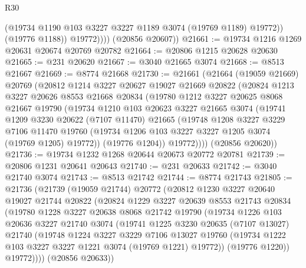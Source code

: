 \begin{lexlean}{R30}
\begin{coremodule}
                  (@19734 @1190 @103 @3227 @3227 @1189 @3074 (@19769 @1189) @19772))
                (@19776 @1188))
              @19772))))
      (@20856 @20607))
@21661 := @19734 @1216 @1269 @20631 @20674 @20769 @20782
@21664 := @20806 @1215 @20628 @20630
@21665 := @231 @20620
@21667 := @3040 @21665 @3074
@21668 := @8513 @21667
@21669 := @8774 @21668
@21730 := @21661
    (@21664
      (@19059 @21669)
      @20769
      (@20812
        @1214
        @3227
        @20627
        @19027
        @21669
        @20822
        (@20824
          @1213
          @3227
          @20626
          @8553
          @21668
          @20834
          (@19780
            @1212
            @3227
            @20625
            @8068
            @21667
            @19790
            (@19734
              @1210
              @103
              @20623
              @3227
              @21665
              @3074
              (@19741
                @1209
                @3230
                @20622
                (@7107 @11470)
                @21665
                (@19748
                  @1208
                  @3227
                  @3229
                  @7106
                  @11470
                  @19760
                  (@19734 @1206 @103 @3227 @3227 @1205 @3074 (@19769 @1205) @19772))
                (@19776 @1204))
              @19772))))
      (@20856 @20620))
@21736 := @19734 @1232 @1268 @20644 @20673 @20772 @20781
@21739 := @20806 @1231 @20641 @20643
@21740 := @231 @20633
@21742 := @3040 @21740 @3074
@21743 := @8513 @21742
@21744 := @8774 @21743
@21805 := @21736
    (@21739
      (@19059 @21744)
      @20772
      (@20812
        @1230
        @3227
        @20640
        @19027
        @21744
        @20822
        (@20824
          @1229
          @3227
          @20639
          @8553
          @21743
          @20834
          (@19780
            @1228
            @3227
            @20638
            @8068
            @21742
            @19790
            (@19734
              @1226
              @103
              @20636
              @3227
              @21740
              @3074
              (@19741
                @1225
                @3230
                @20635
                (@7107 @13027)
                @21740
                (@19748
                  @1224
                  @3227
                  @3229
                  @7106
                  @13027
                  @19760
                  (@19734 @1222 @103 @3227 @3227 @1221 @3074 (@19769 @1221) @19772))
                (@19776 @1220))
              @19772))))
      (@20856 @20633))

\end{coremodule}
\end{lexlean}
